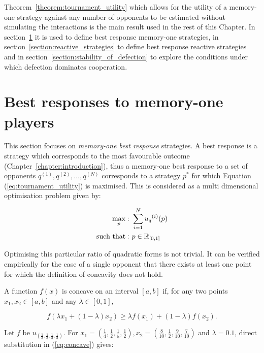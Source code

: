 Theorem~\ref{theorem:tournament_utility} which allows for the utility of a
memory-one strategy against any number of opponents to be estimated without
simulating the interactions is the main result used in the rest of this Chapter. In
section~\ref{section:best_response_mem_one} it is used to define best response
memory-one strategies, in section~\ref{section:reactive_strategies} to define best response
reactive strategies and in section~\ref{section:stability_of_defection}
to explore the conditions under which defection dominates cooperation.

\section{Best responses to memory-one players}\label{section:best_response_mem_one}

This section focuses on \textit{memory-one
best response} strategies. A best response is a strategy which
corresponds to the most favourable outcome (Chapter~\ref{chapter:introduction}), thus a memory-one
best response to a set of opponents \(q^{(1)}, q^{(2)}, \dots, q^{(N)}\) corresponds to a strategy \(p^*\) for which
Equation (\ref{eq:tournament_utility}) is maximised. This is considered as a multi
dimensional optimisation problem given by:

\begin{equation}\label{eq:mo_tournament_optimisation}
    \begin{aligned}
    \max_p: & \ \sum_{i=1} ^ {N} {u_q}^{(i)} (p)
    \\
    \text{such that}: & \ p \in \mathbb{R}_{[0, 1]}
    \end{aligned}
\end{equation}

Optimising this particular ratio of quadratic forms is not trivial. It can be
verified empirically for the case of a single opponent that there exists at
least one point for which the definition of concavity does not hold.

A function \(f(x)\) is concave on an interval \([a, b]\) if, for any two
points \(x_1, x_2 \in [a, b]\) and any \(\lambda \in [0, 1]\), 

\begin{equation}\label{eq:concave}
f (\lambda x_1 + (1 - \lambda )x_2 ) \geq \lambda f (x_1 ) + (1 - \lambda )f (x_2 ).
\end{equation}

Let \(f\) be \(u_{(\frac{1}{3}, \frac{1}{3}, \frac{1}{3}, \frac{1}{3})}\).
For \(x_1 = (\frac{1}{4}, \frac{1}{2}, \frac{1}{5} , \frac{1}{2}),
x_2 = (\frac{8}{10}, \frac{1}{2}, \frac{9}{10} , \frac{7}{10})\) and
\(\lambda=0.1\), direct substitution in (\ref{eq:concave}) gives:

